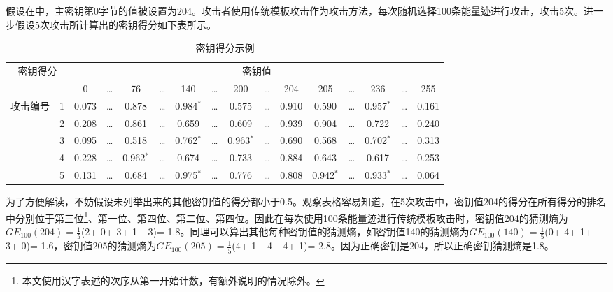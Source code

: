 {	\begin{example}\label{ex:badge}
		假设在中，主密钥第0字节的值被设置为204。攻击者使用传统模板攻击作为攻击方法，每次随机选择100条能量迹进行攻击，攻击5次。进一步假设5次攻击所计算出的密钥得分如下表所示。
		
		\begin{table*}[!h]
			\caption{密钥得分示例}
			\scriptsize{
				\begin{tabular}{cc|cccccccccccccc}
					\hline
					\multicolumn{2}{c|}{\multirow{2}{*}{密钥得分}} & \multicolumn{14}{c}{密钥值} \\
					\multicolumn{2}{c|}{}
					    &     0 & \dots &    76 & \dots &   140 & \dots &   200 & \dots &   204 &   205 & \dots &   236 & \dots &   255\\
					\hline
					\multirow{5}{*}{攻击编号} 
					& 1 & 0.073 & \dots & 0.878 & \dots & 0.984$^*$ & \dots & 0.575 & \dots & 0.910 & 0.590 & \dots & 0.957$^*$ & \dots & 0.161\\
					
					& 2 & 0.208 & \dots & 0.861 & \dots & 0.659 & \dots & 0.609 & \dots & 0.939 & 0.904 & \dots & 0.722 & \dots & 0.240\\
					
					& 3 & 0.095 & \dots & 0.518 & \dots & 0.762$^*$ & \dots & 0.963$^*$ & \dots & 0.690 & 0.568 & \dots & 0.702$^*$ & \dots & 0.313\\
					
					& 4 & 0.228 & \dots & 0.962$^*$ & \dots & 0.674 & \dots & 0.733 & \dots & 0.884 & 0.643 & \dots & 0.617 & \dots & 0.253\\
					
					& 5 & 0.131 & \dots & 0.684 & \dots & 0.975$^*$ & \dots & 0.776 & \dots & 0.808 & 0.942$^*$ & \dots & 0.933$^*$ & \dots & 0.064\\
					
					\hline
				\end{tabular}
			}
		\end{table*}
	
		为了方便解读，不妨假设未列举出来的其他密钥值的得分都小于0.5。观察表格容易知道，在5次攻击中，密钥值204的得分在所有得分的排名中分别位于第三位\footnote{本文使用汉字表述的次序从第一开始计数，有额外说明的情况除外。}、第一位、第四位、第二位、第四位。因此在每次使用100条能量迹进行传统模板攻击时，密钥值204的猜测熵为$GE_{100}(204)=\frac15$(2+ 0+ 3+ 1+ 3)= 1.8。同理可以算出其他每种密钥值的猜测熵，如密钥值140的猜测熵为$GE_{100}(140)=\frac15$(0+ 4+ 1+ 3+ 0)= 1.6，密钥值205的猜测熵为$GE_{100}(205)=\frac15$(4+ 1+ 4+ 4+ 1)= 2.8。因为正确密钥是204，所以正确密钥猜测熵是1.8。
	\end{example}
}
